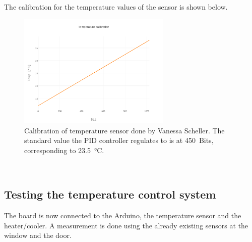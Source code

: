 \documentclass[12pt]{scrartcl}
\begin{document}
      \noindent The calibration for the temperature values of the sensor is shown
      below.
      \begin{figure}[h]
        \centering
        \includegraphics[width = 0.65\textwidth]{./plots/plot_image(4)}
        \caption{Calibration of temperature sensor done by Vanessa Scheller.
        The standard value the PID controller regulates to is at 450~Bits,
        corresponding to 23.5~°C.}
        \label{fig10}
      \end{figure}
      \\
    \subsection{Testing the temperature control system}
      The board is now connected to the Arduino, the temperature sensor and the
      heater/cooler.
      A measurement is done using the already existing sensors at the window and
      the door.
\end{document}
